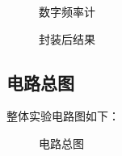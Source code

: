 \documentclass[UTF8,titlepage,a4paper]{ctexart}
\numberwithin{figure}{section}
\begin{document}
\begin{enumerate}
    \begin{figure}[H]
    \centering
     \caption{数字频率计}
     \label{}
    \end{figure}
    \begin{figure}[H]
    \centering
     \caption{封装后结果}
     \label{}
    \end{figure}
\end{enumerate}

\subsection{电路总图}
整体实验电路图如下：
\begin{figure}[H]
\centering
 \caption{电路总图}
 \label{}
\end{figure}
\end{document}
